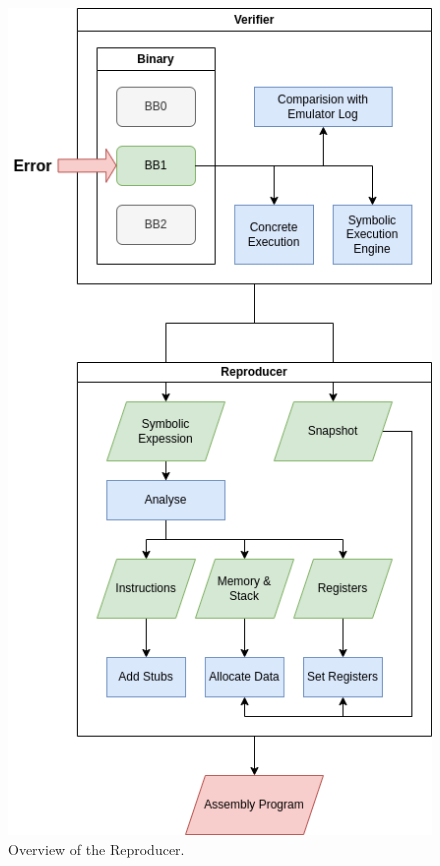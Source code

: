 \begin{figure}[ht]
    \centering
    \includegraphics[width=0.6\linewidth]{figures/rep}
    \caption{Overview of the Reproducer.}
    \label{fig:reproducer}
\end{figure}

